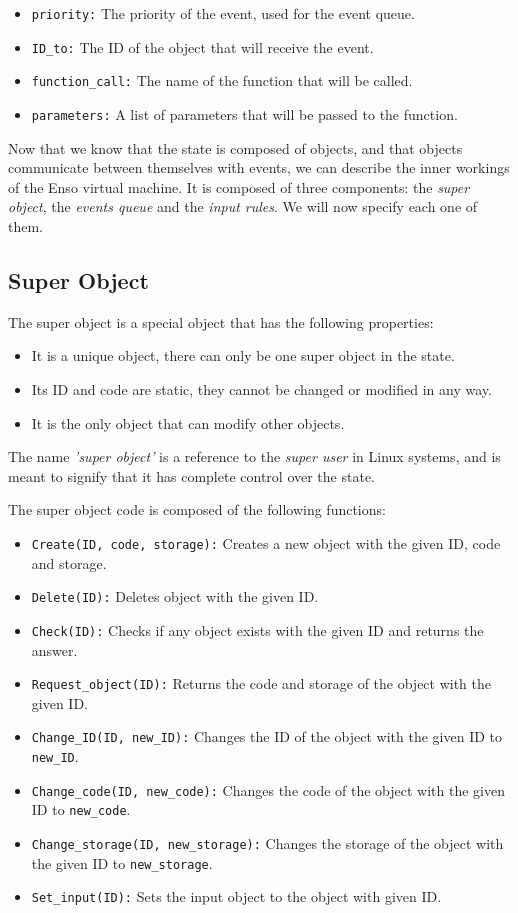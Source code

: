 \documentclass[conference]{IEEEtran}
\begin{document}
\begin{itemize}
	\item \texttt{priority:} The priority of the event, used for the event queue.
	\item \texttt{ID\_to:} The ID of the object that will receive the event.
	\item \texttt{function\_call:} The name of the function that will be called.
	\item \texttt{parameters:} A list of parameters that will be passed to the function.
\end{itemize}

Now that we know that the state is composed of objects, and that objects communicate between themselves with events, we can describe the inner workings of the Enso virtual machine. It is composed of three components: the \textit{super object}, the \textit{events queue} and the \textit{input rules}. We will now specify each one of them.

\subsection{Super Object}
The super object is a special object that has the following properties:

\begin{itemize}
	\item It is a unique object, there can only be one super object in the state.
	\item Its ID and code are static, they cannot be changed or modified in any way.
	\item It is the only object that can modify other objects.
\end{itemize}

The name \textit{'super object'} is a reference to the \textit{super user} in Linux systems, and is meant to signify that it has complete control over the state.

The super object code is composed of the following functions:

\begin{itemize}
	\item \texttt{Create(ID, code, storage):} Creates a new object with the given ID, code and storage.
	\item \texttt{Delete(ID):} Deletes object with the given ID.
	\item \texttt{Check(ID):} Checks if any object exists with the given ID and returns the answer.
	\item \texttt{Request\_object(ID):} Returns the code and storage of the object with the given ID.
	\item \texttt{Change\_ID(ID, new\_ID):} Changes the ID of the object with the given ID to \texttt{new\_ID}.
	\item \texttt{Change\_code(ID, new\_code):} Changes the code of the object with the given ID to \texttt{new\_code}.
	\item \texttt{Change\_storage(ID, new\_storage):} Changes the storage of the object with the given ID to \texttt{new\_storage}.
	\item \texttt{Set\_input(ID):} Sets the input object to the object with given ID.
\end{itemize}
\end{document}
